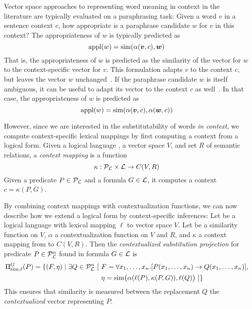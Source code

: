 Vector space approaches to representing word meaning in context in the
literature are typically evaluated on a paraphrasing task: Given a
word $v$ in a sentence context $c$, how appropriate is a paraphrase
candidate 
$w$ for $v$ in this context? The appropriateness of $w$ is typically
predicted as 
\[ \mathrm{appl}(w) = \simfunc(\alpha(\vec v, c), \vec w)\] 
That is, the appropriateness of $w$ is predicted as the similarity of
the vector for $w$ to the context-specific vector for $v$. This
formulation adapts $v$ to the context $c$, but leaves the vector $w$  
unchanged~\citep{erk:emnlp08,MitchellLapata:08,ThaterFuerstenauPinkal:10,vandecruys:emnlp2011}.
If the paraphrase candidate $w$ is itself ambiguous, it can be useful
to adapt its vector to the context $c$ as
well~\citep{erk:acl2010}. In that case, the appropriateness of $w$ is
predicted as 
\[ \mathrm{appl}(w) = \simfunc(\alpha(\vec v, c), \alpha(\vec w, c)) \]




However, since we are interested in the substitutability of words {\it in
context}, we compute context-specific lexical mappings by first computing a
context from a logical form. Given a logical language \loglang, a vector space
$V$, and set $R$ of semantic relations, a \textit{context mapping} is a function
\[ \kappa: {\cal{P}}_{{\cal{L}}} \times {\cal{L}} \to C(V, R) \] Given a predicate
$P \in {\cal{P}}_{{\cal{L}}}$ and a formula $G \in {\cal{L}}$, it computes a context
$c = \kappa(P, G)$.

By combining context mappings with contextualization functions, we can now
describe how we extend a logical form by context-specific inferences: Let
\loglang be a logical language with lexical mapping $\ell$ to vector space $V$.
Let \simfunc{} be a similarity function on $V$, $\alpha$ a contextualization function
on $V$ and $R$, and $\kappa$ a context mapping from \loglang to $C(V, R)$.
Then the \textit{contextualized substitution projection} for predicate $P \in
{\cal{P}}_{{\cal{L}}}^n$ found in formula $G \in {\cal{L}}$ is
\begin{align*}
\Pi^G_{\mathrm{sim}, \ell}(P) = \{ (F, \eta) \mid \exists Q \in {\cal{P}}_{{\cal{L}}}^n~[ 
&~F = \forall x_1, \ldots, x_n.[P(x_1, \ldots, x_n) \to Q(x_1, \ldots, x_n)], \\
&~\eta = \mathrm{sim}\big(\alpha(\ell(P), \kappa(P, G)), \ell(Q)\big) ~] \}
\end{align*}
This ensures that similarity is measured between the replacement $Q$ the {\em contextualized}
vector representing $P$.

